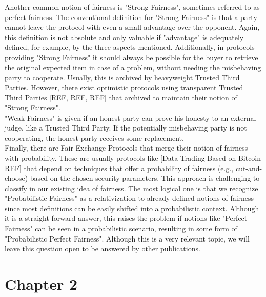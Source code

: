 \documentclass{cacthesis}
\begin{document}
        Another common notion of fairness is "Strong Fairness", sometimes referred to as perfect fairness. The conventional definition for "Strong Fairness" is that a party cannot leave the protocol with even a small advantage over the opponent. Again, this definition is not absolute and only valuable if "advantage" is adequately defined, for example, by the three aspects mentioned. Additionally, in protocols providing "Strong Fairness" it should always be possible for the buyer to retrieve the original expected item in case of a problem, without needing the misbehaving party to cooperate. Usually, this is archived by heavyweight Trusted Third Parties. However, there exist optimistic protocols using transparent Trusted Third Parties [REF, REF, REF] that archived to maintain their notion of "Strong Fairness". \\
        "Weak Fairness" is given if an honest party can prove his honesty to an external judge, like a Trusted Third Party. If the potentially misbehaving party is not cooperating, the honest party receives some replacement. \\
        Finally, there are Fair Exchange Protocols that merge their notion of fairness with probability. These are usually protocols like [Data Trading Based on Bitcoin REF] that depend on techniques that offer a probability of fairness (e.g., cut-and-choose) based on the chosen security parameters. This approach is challenging to classify in our existing idea of fairness. The most logical one is that we recognize "Probabilistic Fairness" as a relativization to already defined notions of fairness since most definitions can be easily shifted into a probabilistic context. Although it is a straight forward answer, this raises the problem if notions like "Perfect Fairness" can be seen in a probabilistic scenario, resulting in some form of "Probabilistic Perfect Fairness". Although this is a very relevant topic, we will leave this question open to be answered by other publications.


		
	\chapter{Chapter 2}
	
	
	\appendix
\end{document}
